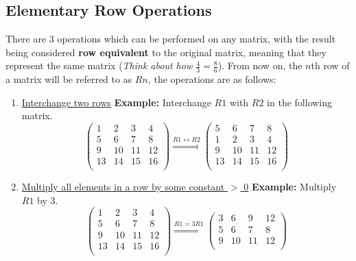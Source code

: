 \documentclass[a4paper]{article}
\begin{document}
  \subsection{Elementary Row Operations}
  There are 3 operations which can be performed on any matrix, with the result being considered \textbf{row equivalent} to the original matrix, meaning that they represent the same matrix (\textit{Think about how $\frac{4 }{3} = \frac{8 }{6}$}). From now on, the $n$th row of a matrix will be referred to as $Rn$, the operations are as follows:
  \begin{enumerate}
    \item \underline{Interchange two rows}\newline
      \textbf{Example:} Interchange $R1$ with $R2$ in the following matrix.
      \[
        \begin{pmatrix}
          1 & 2 & 3 & 4 \\  
          5 & 6 & 7 & 8 \\  
          9 & 10 & 11 & 12 \\  
          13 & 14 & 15 & 16 \\  
        \end{pmatrix} \overset{R1 \leftrightarrow R2}{\Rightarrow}
        \begin{pmatrix}
          5 & 6 & 7 & 8 \\  
          1 & 2 & 3 & 4 \\  
          9 & 10 & 11 & 12 \\  
          13 & 14 & 15 & 16 \\  
        \end{pmatrix}
      \]
    \item \underline{Multiply all elements in a row by some constant $>$ 0}\newline
      \textbf{Example:} Multiply $R1$ by 3.
      \[
        \begin{pmatrix}
          1 & 2 & 3 & 4 \\  
          5 & 6 & 7 & 8 \\  
          9 & 10 & 11 & 12 \\  
          13 & 14 & 15 & 16 \\  
        \end{pmatrix} \overset{R1 = 3R1}{\Rightarrow}
        \begin{pmatrix}
          3 & 6 & 9 & 12 \\  
          5 & 6 & 7 & 8 \\  
          9 & 10 & 11 & 12 \\  

\end{pmatrix}\]
\end{enumerate}
\end{document}

